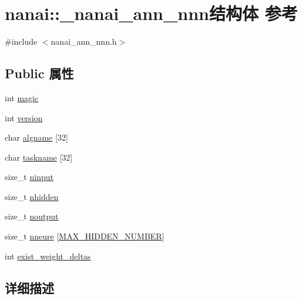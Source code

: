 \hypertarget{structnanai_1_1__nanai__ann__nnn}{}\section{nanai\+:\+:\+\_\+nanai\+\_\+ann\+\_\+nnn结构体 参考}
\label{structnanai_1_1__nanai__ann__nnn}


{\ttfamily \#include $<$nanai\+\_\+ann\+\_\+nnn.\+h$>$}

\subsection*{Public 属性}
\begin{DoxyCompactItemize}
\item 
int \hyperlink{structnanai_1_1__nanai__ann__nnn_a7933ac2b57f4f25860baeea2e817cb07}{magic}
\item 
int \hyperlink{structnanai_1_1__nanai__ann__nnn_ab986fa5da43831770820c02fd91bc35f}{version}
\item 
char \hyperlink{structnanai_1_1__nanai__ann__nnn_a2d2b2bebff29680023fb37c6ba5ff657}{algname} \mbox{[}32\mbox{]}
\item 
char \hyperlink{structnanai_1_1__nanai__ann__nnn_ae2b106d80b290da6c7cf6b73cec66ba0}{taskname} \mbox{[}32\mbox{]}
\item 
size\+\_\+t \hyperlink{structnanai_1_1__nanai__ann__nnn_a8f4a167d7f34af6615a846c9af01dd10}{ninput}
\item 
size\+\_\+t \hyperlink{structnanai_1_1__nanai__ann__nnn_a1da94c33f6b4599404417479b858f2f2}{nhidden}
\item 
size\+\_\+t \hyperlink{structnanai_1_1__nanai__ann__nnn_aa0dc46c72569cc28a7e6282413d1a68f}{noutput}
\item 
size\+\_\+t \hyperlink{structnanai_1_1__nanai__ann__nnn_a941eeb9bbbf91e6366ad0a3e6b9db187}{nneure} \mbox{[}\hyperlink{nanai__ann__nanndesc_8h_a6e62108830287144c83d4681c2d59381}{M\+A\+X\+\_\+\+H\+I\+D\+D\+E\+N\+\_\+\+N\+U\+M\+B\+E\+R}\mbox{]}
\item 
int \hyperlink{structnanai_1_1__nanai__ann__nnn_a8ce4ec15d75481ca2c5e99f297fddd01}{exist\+\_\+weight\+\_\+deltas}
\end{DoxyCompactItemize}


\subsection{详细描述}


